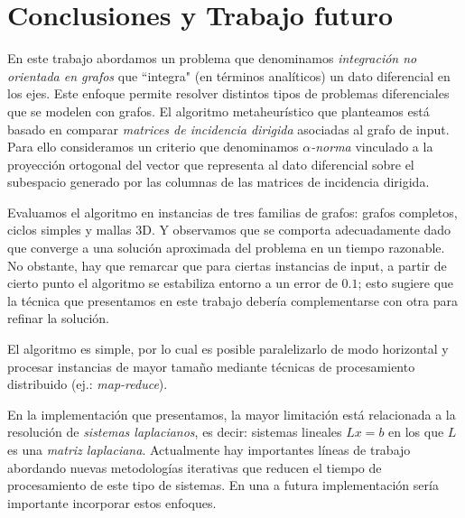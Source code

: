 \documentclass[conference,compsoc,a4paper]{IEEEtran}
\begin{document}

\section{Conclusiones y Trabajo futuro}

En este trabajo abordamos un problema que denominamos \emph{integración 
no orientada en grafos} que ``integra" (en términos analíticos) un dato 
diferencial en los ejes. Este enfoque permite resolver distintos tipos 
de problemas diferenciales que se modelen con grafos. El algoritmo 
metaheurístico que planteamos está basado en comparar \emph{matrices 
de incidencia dirigida} asociadas al grafo de input. Para ello 
consideramos un criterio que denominamos \emph{$\alpha$-norma} vinculado 
a la proyección ortogonal del vector que representa al dato diferencial 
sobre el subespacio generado por las columnas de las matrices de 
incidencia dirigida.

\bigskip

Evaluamos el algoritmo en instancias de tres familias de grafos: grafos 
completos, ciclos simples y mallas 3D. Y observamos que se comporta 
adecuadamente dado que converge a una solución aproximada del problema 
en un tiempo razonable. No obstante, hay que remarcar que para ciertas 
instancias de input, a partir de cierto punto el algoritmo se 
estabiliza entorno a un error de $0.1$; esto sugiere que la técnica que 
presentamos en este trabajo debería complementarse con otra para 
refinar la solución.

\bigskip

El algoritmo es simple, por lo cual es posible paralelizarlo de modo 
horizontal y procesar instancias de mayor tamaño mediante técnicas 
de procesamiento distribuido (ej.: \emph{map-reduce}).

\bigskip

En la implementación que presentamos, la mayor limitación está 
relacionada a la resolución de \emph{sistemas laplacianos}, es decir: 
sistemas lineales $Lx=b$ en los que $L$ es una \emph{matriz 
laplaciana}. Actualmente hay importantes líneas de trabajo abordando 
nuevas metodologías iterativas que reducen el tiempo de 
procesamiento de este tipo de sistemas. En una a futura implementación
 sería importante incorporar estos enfoques. 
\end{document}
